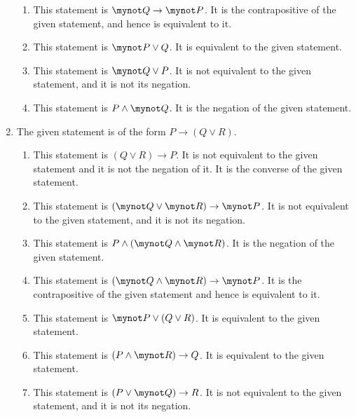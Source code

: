 \begin{enumerate}
\begin{enumerate}
\item This statement is $\mynot Q \to \mynot P$.  It is the contrapositive of the given statement, and hence is equivalent to it.

\item This statement is $\mynot P \vee Q$.  It is equivalent to the given statement.

\item This statement is $\mynot Q \vee P$.  It is not equivalent to the given statement, and it is not its negation.

\item This statement is $P \wedge \mynot Q$.  It is the negation of the given statement.
\end{enumerate}

\item The given statement is of the form $P \to \left( Q \vee R \right)$.

\begin{enumerate}
\item This statement is $\left( Q \vee R \right) \to P$.  It is not equivalent to the given statement and it is not the negation of it.  It is the converse of the given statement.

\item This statement is $\left( \mynot Q \vee \mynot R \right) \to \mynot P$.  It is not equivalent to the given statement, and it is not its negation.

\item This statement is $P \wedge \left( \mynot Q \wedge \mynot R \right)$.  It is the negation of the given statement.

\item This statement is $\left( \mynot Q \wedge \mynot R \right) \to \mynot P$.  It is the contrapositive of the given statement and hence is equivalent to it.

\item This statement is $\mynot P \vee \left( Q \vee R \right)$.  It is equivalent to the given statement.

\item This statement is $\left( P \wedge \mynot R \right) \to Q$.  It is equivalent to the given statement.

\item This statement is $\left( P \vee \mynot Q \right) \to R$.  It is not equivalent to the given statement, and it is not its negation.
\end{enumerate}



\end{enumerate}
